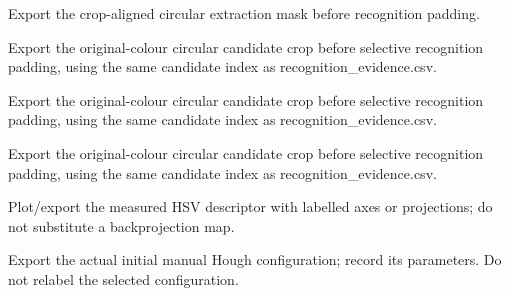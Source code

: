 \par\noindent\begin{minipage}{\linewidth}\small{}\par Export the crop-aligned circular extraction mask before recognition padding.
\end{minipage}\par\medskip
\par\noindent\begin{minipage}{\linewidth}\small{}\par Export the original-colour circular candidate crop before selective recognition padding, using the same candidate index as recognition\_evidence.csv.
\end{minipage}\par\medskip
\par\noindent\begin{minipage}{\linewidth}\small{}\par Export the original-colour circular candidate crop before selective recognition padding, using the same candidate index as recognition\_evidence.csv.
\end{minipage}\par\medskip
\par\noindent\begin{minipage}{\linewidth}\small{}\par Export the original-colour circular candidate crop before selective recognition padding, using the same candidate index as recognition\_evidence.csv.
\end{minipage}\par\medskip
\par\noindent\begin{minipage}{\linewidth}\small{}\par Plot/export the measured HSV descriptor with labelled axes or projections; do not substitute a backprojection map.
\end{minipage}\par\medskip
\par\noindent\begin{minipage}{\linewidth}\small{}\par Export the actual initial manual Hough configuration; record its parameters. Do not relabel the selected configuration.
\end{minipage}\par\medskip
